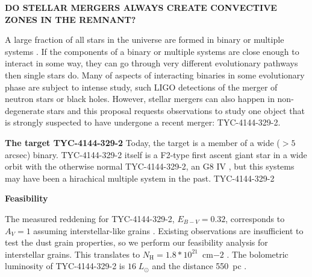 \documentclass[letterpaper,11pt]{article}
\begin{document}
\pagestyle{plain}


 

\begin{center} 
\bfseries\uppercase{%
Do stellar mergers always create convective zones in the remnant?
}
\end{center}





A large fraction of all stars in the universe are formed in binary or multiple systems \cite{}. If the components of a binary or multiple systems are close enough to interact in some way, they can go through very different evolutionary pathways then single stars do. Many of aspects of interacting binaries in some evolutionary phase are subject to intense study, such LIGO detections of the merger of neutron stars or black holes. However, stellar mergers can also happen in non-degenerate stars and this proposal requests observations to study one object that is strongly suspected to have undergone a recent merger: TYC-4144-329-2. 


\textbf{The target TYC-4144-329-2}
Today, the target is a member of a wide ($> 5$ arcsec) binary. TYC-4144-329-2 itself is a F2-type first ascent giant star in a wide orbit with the otherwise normal  TYC-4144-329-2, an G8 IV \cite{2009ApJ...696.1964M}, but this systems may have been a hirachical multiple system in the past. TYC-4144-329-2 


\textbf{Feasibility}

The measured reddening for TYC-4144-329-2, $E_{B−V} = 0.32$, corresponds to $A_V = 1$ assuming interstellar-like grains \cite{2009ApJ...696.1964M}. Existing observations are insufficient to test the dust grain properties, so we perform our feasibility analysis for interstellar grains. This translates to $N_\mathrm{H} = 1.8*10^{21}$~cm${-2}$ \cite{1995A&A...293..889P}. The bolometric luminosity of TYC-4144-329-2 is $16\;L_\odot$ and the distance 550~pc \cite{2009ApJ...696.1964M}.
\end{document}
